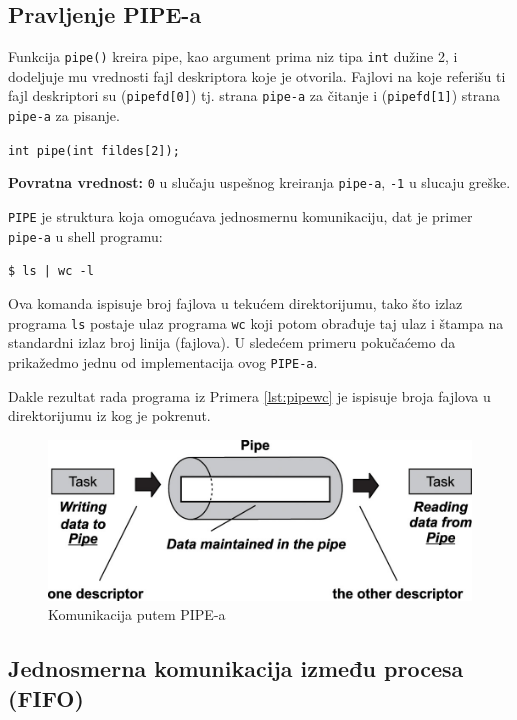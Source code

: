 \documentclass[a4paper, 11pt]{article}
\newcommand{\scode}[3] {
	\hspace{.06\textwidth} 
	\begin{minipage}[t]{.88\textwidth} %
		\begin{mdframed}[topline=true,bottomline=true,leftline=true,rightline=true,backgroundcolor=gray!22, linecolor=gray!60!black,roundcorner=1mm]
			 

	\begin{center}
		\caption{\textbf{Primer \ref{lst:#3}:} #2}
	\end{center}
	\end{mdframed}
	\end{minipage}

}
\begin{document}
\newpage
\subsection{Pravljenje PIPE-a}
Funkcija \texttt{pipe()} kreira pipe, kao argument prima niz tipa \texttt{int} dužine 2, i dodeljuje mu vrednosti fajl deskriptora koje je otvorila. Fajlovi na koje referišu ti fajl deskriptori su (\texttt{pipefd[0]}) tj. strana \texttt{pipe-a} za čitanje i (\texttt{pipefd[1]}) strana \texttt{pipe-a} za pisanje.  
\begin{center}
	\texttt{int pipe(int fildes[2]);}
\end{center}

\textbf{Povratna vrednost:} \texttt{0} u slučaju uspešnog kreiranja \texttt{pipe-a}, \texttt{-1} u slucaju greške.

\texttt{PIPE} je struktura koja omogućava jednosmernu komunikaciju, dat je primer \texttt{pipe-a} u shell programu: 

\begin{center}
	\texttt{\$ ls | wc -l}  
\end{center}

Ova komanda ispisuje broj fajlova u tekućem direktorijumu, tako što izlaz programa \texttt{ls} postaje ulaz programa \texttt{wc} koji potom obrađuje taj ulaz i štampa na standardni izlaz broj linija (fajlova).
U sledećem primeru pokučaćemo da prikažedmo jednu od implementacija ovog \texttt{PIPE-a}.

\scode{pipe.c}{Pipe (ls | wc -l) izmedju roditelja i deteta}{pipewc}
\vspace{3mm} 

Dakle rezultat rada programa iz Primera \ref{lst:pipewc} je ispisuje broja fajlova u direktorijumu iz kog je pokrenut.
\newpage

\begin{figure}[h]
	\centering
	\vspace{3mm} 
	\includegraphics[width=.65\textwidth]{pipe.jpg} %
	\caption{Komunikacija putem PIPE-a}
	\label{fig:lpipe}
\end{figure}

\subsection{Jednosmerna komunikacija između procesa (FIFO)}
\end{document}
